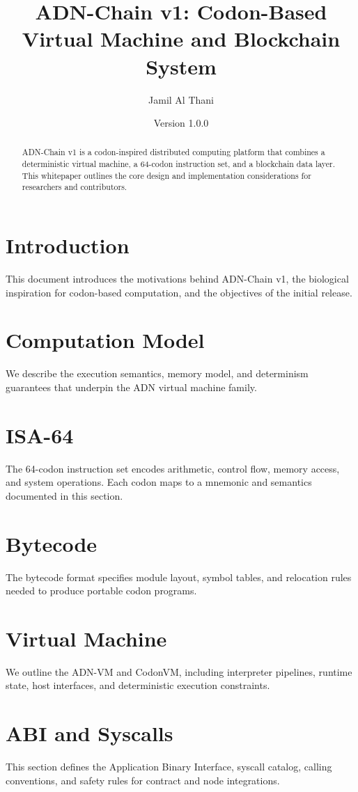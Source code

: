\documentclass[11pt]{article}
\title{ADN-Chain v1: Codon-Based Virtual Machine and Blockchain System}
\author{Jamil Al Thani}
\date{Version 1.0.0}
\begin{document}
\maketitle
\begin{abstract}
ADN-Chain v1 is a codon-inspired distributed computing platform that combines a
deterministic virtual machine, a 64-codon instruction set, and a blockchain
data layer. This whitepaper outlines the core design and implementation
considerations for researchers and contributors.
\end{abstract}

\section{Introduction}
This document introduces the motivations behind ADN-Chain v1, the biological
inspiration for codon-based computation, and the objectives of the initial
release.

\section{Computation Model}
We describe the execution semantics, memory model, and determinism guarantees
that underpin the ADN virtual machine family.

\section{ISA-64}
The 64-codon instruction set encodes arithmetic, control flow, memory access,
and system operations. Each codon maps to a mnemonic and semantics documented in
this section.

\section{Bytecode}
The bytecode format specifies module layout, symbol tables, and relocation rules
needed to produce portable codon programs.

\section{Virtual Machine}
We outline the ADN-VM and CodonVM, including interpreter pipelines, runtime
state, host interfaces, and deterministic execution constraints.

\section{ABI and Syscalls}
This section defines the Application Binary Interface, syscall catalog, calling
conventions, and safety rules for contract and node integrations.
\end{document}
